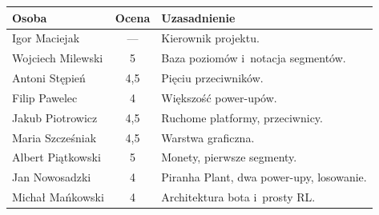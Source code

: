 \documentclass[11pt,a4paper]{article}
\begin{document}
\begin{tabularx}{\textwidth}{@{}p{3.6cm} c X@{}}
\toprule
\textbf{Osoba} & \textbf{Ocena} & \textbf{Uzasadnienie} \\
\midrule
Igor Maciejak     & --- & Kierownik projektu. \\
Wojciech Milewski & 5   & Baza poziomów i~notacja segmentów. \\
Antoni Stępień    & 4,5 & Pięciu przeciwników. \\
Filip Pawelec     & 4   & Większość power-upów. \\
Jakub Piotrowicz  & 4,5 & Ruchome platformy, przeciwnicy. \\
Maria Szcześniak  & 4,5 & Warstwa graficzna. \\
Albert Piątkowski & 5   & Monety, pierwsze segmenty. \\
Jan Nowosadzki    & 4   & Piranha Plant, dwa power-upy, losowanie. \\
Michał Mańkowski  & 4   & Architektura bota i~prosty RL. \\
\bottomrule
\end{tabularx}
\end{document}
